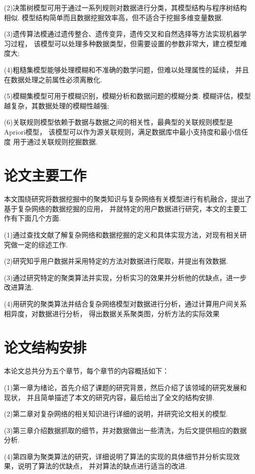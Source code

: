 \documentclass[bachelor,adobefonts]{jnuthesis}
\begin{document}
(2)决策树模型可用于通过一系列规则对数据进行分类，其模型结构与程序树结构相似.
模型结构简单而且数据挖掘效率高，但不适合于挖掘多维变量数据.

(3)遗传算法模通过遗传整合、遗传变异，遗传交叉和自然选择等方法实现机器学习过程，
该模型可以处理多种数据类型，但需要设置的参数非常大，建立模型难度大;

(4)粗糙集模型能够处理模糊和不准确的数学问题，但难以处理属性的延续，
并且在数据处理之前属性必须离散化.

(5)模糊集模型可用于模糊识别，模糊分析和数据问题的模糊分类. 
模糊评估，模型越复杂，其数据处理的模糊性越强;

(6)关联规则模型依赖于数据与数据之间的相关性，最典型的关联规则模型是Apriori模型，
该模型可以作为源关联规则，满足数据库中最小支持度和最小信任度 用于通过关联规则挖掘数据.


\section{论文主要工作}
本文围绕研究将数据挖掘中的聚类知识与复杂网络有关模型进行有机融合，提出了基于复杂网络的数据挖掘的应用，
并就特定的用户数据进行研究，本文的主要工作有下面几个方面.

(1)通过查找文献了解复杂网络和数据挖掘的定义和具体实现方法，对现有相关研究做一定的综述工作.

(2)研究知乎用户数据并采用特定的方法对数据进行爬取，并提出有效数据.

(3)通过研究特定的聚类算法并实现，分析实习的效果并分析他的优缺点，进一步改进算法.

(4)用研究的聚类算法并结合复杂网络模型对数据进行分析，通过计算用户间关系相异度，对数据进行分析，
得出数据关系聚类图，分析方法的实际效果

\section{论文结构安排}
本论文总共分为五个章节，每个章节的内容概括如下：

(1)第一章为绪论，首先介绍了课题的研究背景，然后介绍了该领域的研究发展和现状，
并且简单描述了本文的研究内容，最后给出了全文的结构安排.

(2)第二章对复杂网络的相关知识进行详细的说明，并研究论文相关的模型.

(3)第三章介绍数据抓取的细节，并对数据做出一些清洗，为后文提供相应的数据分析.

(4)第四章为聚类算法的研究，详细说明了算法的实现的具体细节并分析实现效果，说明了算法的优缺点，
并对算法的缺点进行适当的改进.
\end{document}
